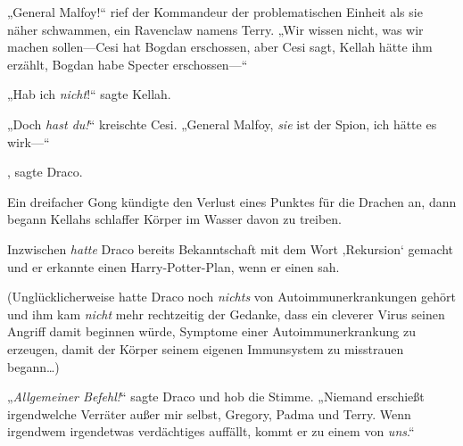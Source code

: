 „General Malfoy!“ rief der Kommandeur der problematischen Einheit als sie näher schwammen, ein Ravenclaw namens Terry. „Wir wissen nicht, was wir machen sollen—Cesi hat Bogdan erschossen, aber Cesi sagt, Kellah hätte ihm erzählt, Bogdan habe Specter erschossen—“

„Hab ich \emph{nicht}!“ sagte Kellah.

„Doch \emph{hast du!}“ kreischte Cesi. „General Malfoy, \emph{sie} ist der Spion, ich hätte es wirk—“

, sagte Draco.

Ein dreifacher Gong kündigte den Verlust eines Punktes für die Drachen an, dann begann Kellahs schlaffer Körper im Wasser davon zu treiben.

Inzwischen \emph{hatte} Draco bereits Bekanntschaft mit dem Wort ‚Rekursion‘ gemacht und er erkannte einen Harry-Potter-Plan, wenn er einen sah.

(Unglücklicherweise hatte Draco noch \emph{nichts} von Autoimmunerkrankungen gehört und ihm kam \emph{nicht} mehr rechtzeitig der Gedanke, dass ein cleverer Virus seinen Angriff damit beginnen würde, Symptome einer Autoimmunerkrankung zu erzeugen, damit der Körper seinem eigenen Immunsystem zu misstrauen begann…)

„\emph{Allgemeiner Befehl!}“ sagte Draco und hob die Stimme. „Niemand erschießt irgendwelche Verräter außer mir selbst, Gregory, Padma und Terry. Wenn irgendwem irgendetwas verdächtiges auffällt, kommt er zu einem von \emph{uns}.“

